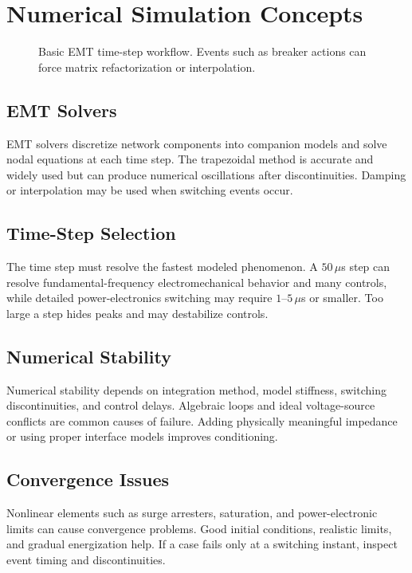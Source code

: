 \documentclass[11pt]{article}
\begin{document}
\section{Numerical Simulation Concepts}
\begin{figure}[h]
\centering

\caption{Basic EMT time-step workflow. Events such as breaker actions can force matrix refactorization or interpolation.}
\end{figure}

\subsection{EMT Solvers}
EMT solvers discretize network components into companion models and solve nodal equations at each time step. The trapezoidal method is accurate and widely used but can produce numerical oscillations after discontinuities. Damping or interpolation may be used when switching events occur.

\subsection{Time-Step Selection}
The time step must resolve the fastest modeled phenomenon. A $50\,\mu$s step can resolve fundamental-frequency electromechanical behavior and many controls, while detailed power-electronics switching may require $1$--$5\,\mu$s or smaller. Too large a step hides peaks and may destabilize controls.

\subsection{Numerical Stability}
Numerical stability depends on integration method, model stiffness, switching discontinuities, and control delays. Algebraic loops and ideal voltage-source conflicts are common causes of failure. Adding physically meaningful impedance or using proper interface models improves conditioning.

\subsection{Convergence Issues}
Nonlinear elements such as surge arresters, saturation, and power-electronic limits can cause convergence problems. Good initial conditions, realistic limits, and gradual energization help. If a case fails only at a switching instant, inspect event timing and discontinuities.
\end{document}
